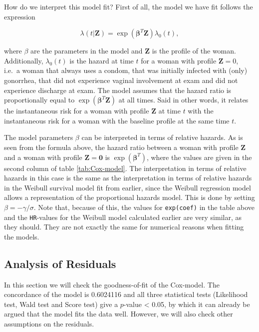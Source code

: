 \documentclass[
]{article}
\begin{document}
How do we interpret this model fit? First of all, the model we have fit follows the expression

\[
\lambda(t|\mathbf{Z}) =  \exp(\mathbf{\beta}^T\mathbf{Z})\lambda_0(t),  
\]

where \(\beta\) are the parameters in the model and \(\mathbf{Z}\) is the profile of the woman. Additionally, \(\lambda_0(t)\) is the hazard at time \(t\) for a woman with profile \(\mathbf{Z} = 0\), i.e.~a woman that always uses a condom, that was initially infected with (only) gonorrhea, that did not experience vaginal involvement at exam and did not experience discharge at exam. The model assumes that the hazard ratio is proportionally equal to \(\exp(\mathbf{\beta}^T\mathbf{Z})\) at all times. Said in other words, it relates the instantaneous risk for a woman with profile \(\mathbf{Z}\) at time \(t\) with the instantaneous risk for a woman with the baseline profile at the same time \(t\).

The model parameters \(\beta\) can be interpreted in terms of relative hazards. As is seen from the formula above, the hazard ratio between a woman with profile \(\mathbf{Z}\) and a woman with profile \(\mathbf{Z} = \mathbf{0}\) is \(\exp(\mathbf{\beta}^T)\), where the values are given in the second column of table \ref{tab:Cox-model}. The interpretation in terms of relative hazards in this case is the same as the interpretation in terms of relative hazards in the Weibull survival model fit from earlier, since the Weibull regression model allows a representation of the proportional hazards model. This is done by setting \(\beta = -\gamma/\sigma\). Note that, because of this, the values for \texttt{exp(coef)} in the table above and the \texttt{HR}-values for the Weibull model calculated earlier are very similar, as they should. They are not exactly the same for numerical reasons when fitting the models.

\hypertarget{analysis-of-residuals}{%
\subsection{Analysis of Residuals}\label{analysis-of-residuals}}

In this section we will check the goodness-of-fit of the Cox-model. The concordance of the model is 0.6024116 and all three statistical tests (Likelihood test, Wald test and Score test) give a \(p\)-value \textless{} 0.05, by which it can already be argued that the model fits the data well. However, we will also check other assumptions on the residuals.
\end{document}
